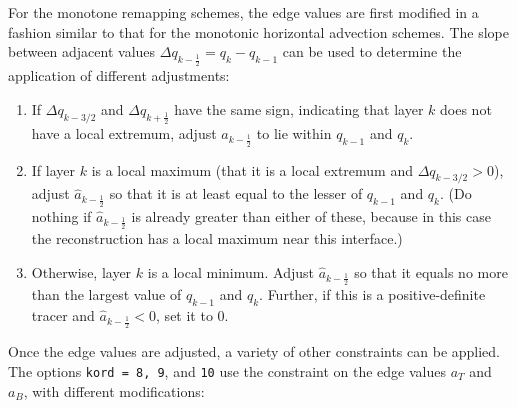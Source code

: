 \documentclass[10pt,letterpaper,margin=1in]{memoir}
\newcommand{\half}{\frac{1}{2}}
\begin{document}
For the monotone remapping schemes, the edge values are first modified in a fashion similar to that for the monotonic horizontal advection schemes. The slope between adjacent values $\Delta q_{k-\half} = q_k - q_{k-1}$ can be used to determine the application of different adjustments:
\begin{enumerate}
\item If $\Delta q_{k-3/2}$ and $\Delta q_{k+\half}$ have the same sign, indicating that layer $k$ does not have a local extremum, adjust $\widehat{a}_{k-\half}$ to lie within $q_{k-1}$ and $q_k$.
\item If layer $k$ is a local maximum (that it is a local extremum and $\Delta q_{k-3/2} > 0$), adjust $\widehat{a}_{k-\half}$ so that it is at least equal to the lesser of $q_{k-1}$ and $q_k$. (Do nothing if $\widehat{a}_{k-\half}$ is already greater than either of these, because in this case the reconstruction has a local maximum near this interface.)
\item Otherwise, layer $k$ is a local minimum. Adjust  $\widehat{a}_{k-\half}$ so that it equals no more than the largest value of $q_{k-1}$ and $q_k$. Further, if this is a positive-definite tracer and  $\widehat{a}_{k-\half} < 0$, set it to 0.
\end{enumerate}
Once the edge values are adjusted, a variety of other constraints can be applied. The options \texttt{kord = 8, 9}, and \texttt{10} use the \citet{Huynh1997} constraint on the edge values $a_T$ and $a_B$, with different modifications:
\end{document}

